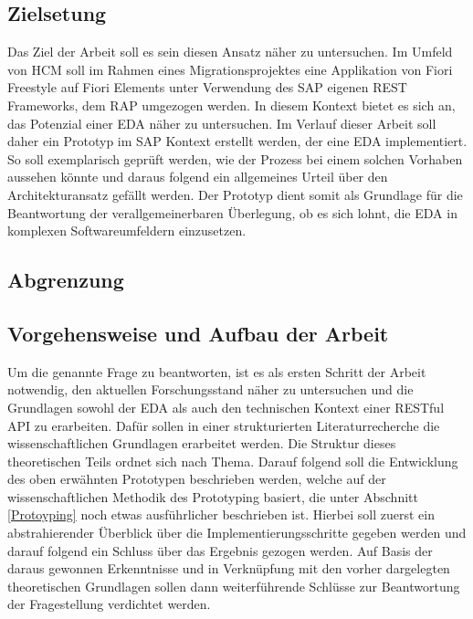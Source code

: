 \subsection{Zielsetung}
Das Ziel der Arbeit soll es sein diesen Ansatz näher zu untersuchen. Im Umfeld von HCM soll im Rahmen eines Migrationsprojektes eine Applikation von Fiori Freestyle auf Fiori Elements unter Verwendung des SAP eigenen \ac{REST} Frameworks, dem \ac{RAP} umgezogen werden. In diesem Kontext bietet es sich an, das Potenzial einer \ac{EDA} näher zu untersuchen. Im Verlauf dieser Arbeit soll daher ein Prototyp im SAP Kontext erstellt werden, der eine \ac{EDA} implementiert. So soll exemplarisch geprüft werden, wie der Prozess bei einem solchen Vorhaben aussehen könnte und daraus folgend ein allgemeines Urteil über den Architekturansatz gefällt werden. Der Prototyp dient somit als Grundlage für die Beantwortung der verallgemeinerbaren Überlegung, ob es sich lohnt, die \ac{EDA} in komplexen Softwareumfeldern einzusetzen.

\subsection{Abgrenzung}

\subsection{Vorgehensweise und Aufbau der Arbeit}
Um die genannte Frage zu beantworten, ist es als ersten Schritt der Arbeit notwendig, den aktuellen Forschungsstand näher zu untersuchen und die Grundlagen sowohl der \ac{EDA} als auch den technischen Kontext einer RESTful API zu erarbeiten. Dafür sollen in einer strukturierten Literaturrecherche die wissenschaftlichen Grundlagen erarbeitet werden. Die Struktur dieses theoretischen Teils ordnet sich nach Thema. Darauf folgend soll die Entwicklung des oben erwähnten Prototypen beschrieben werden, welche auf der wissenschaftlichen Methodik des Prototyping basiert, die unter Abschnitt \ref{Protoyping} noch etwas ausführlicher beschrieben ist. Hierbei soll zuerst ein abstrahierender Überblick über die Implementierungsschritte gegeben werden und darauf folgend ein Schluss über das Ergebnis gezogen werden. Auf Basis der daraus gewonnen Erkenntnisse und in Verknüpfung mit den vorher dargelegten theoretischen Grundlagen sollen dann weiterführende Schlüsse zur Beantwortung der Fragestellung verdichtet werden.